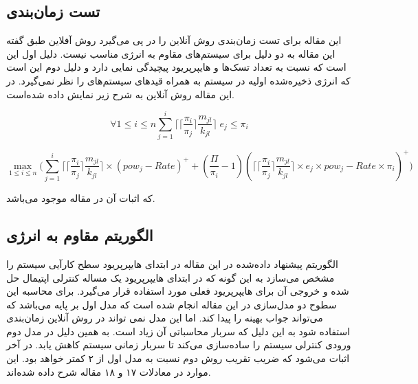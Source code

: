 \documentclass[a4paper, 11pt]{article}
\begin{document}
\subsection{تست زمان‌بندی}
این مقاله برای تست زمان‌بندی روش آنلاین را در پی می‌گیرد
روش آفلاین طبق گفته این مقاله به دو دلیل برای سیستم‌های مقاوم به انرژی مناسب نیست.
دلیل اول این‌ است که نسبت به تعداد تسک‌ها و هایپرپریود پیچیدگی نمایی دارد و دلیل دوم این است
که انرژی ذخیره‌شده اولیه در سیستم به همراه قید‌های سیستم‌های
را نظر نمی‌گیرد.
در این مقاله روش آنلاین به شرح زیر نمایش داده شده‌است.

\begin{equation}
    \forall 1 \le i \le n \sum_{j=1}^{i}\lceil \lceil \frac{\pi_i}{\pi_j} \rceil
\frac{m_{jl}}{k_{jl}} \rceil \; e_j \le \pi_i
\end{equation}

\begin{equation}
    \max\limits_{1 \le i \le n}\Bigg( \sum_{j=1}^{i}\lceil \lceil
\frac{\pi_i}{\pi_j} \rceil \frac{m_{jl}}{k_{jl}} \rceil \times (pow_j - Rate)^+
+  (\frac{\Pi}{\pi_i} - 1)(\lceil \lceil
\frac{\pi_i}{\pi_j} \rceil \frac{m_{jl}}{k_{jl}} \rceil \times e_j \times 
pow_j -Rate \times \pi_i)^+ \Bigg)
\end{equation}

که اثبات آن در مقاله موجود می‌باشد.

\subsection{الگوریتم مقاوم به انرژی}
الگوریتم پیشنهاد داده‌شده در این مقاله در ابتدای هایپرپریود سطح کارآیی سیستم را مشخص می‌سازد
به این گونه که در ابتدای هایپرپریود یک مساله کنترلی اپتیمال حل شده و خروجی آن
برای هایپرپریود فعلی مورد استفاده قرار می‌گیرد.
برای محاسبه این سطوح دو مدل‌سازی در این مقاله انجام شده است که مدل اول بر پایه
می‌باشد که می‌تواند جواب بهینه را پیدا کند. اما این مدل نمی تواند در روش آنلاین زمان‌بندی استفاده
شود به این دلیل که سربار محاسباتی آن زیاد است. به همین دلیل در مدل دوم ورودی کنترلی سیستم
را ساده‌سازی می‌کند تا سربار زمانی سیستم کاهش یابد. در آخر اثبات می‌شود که ضریب تقریب
روش دوم نسبت به مدل اول از ۲ کمتر خواهد بود.
این موارد در معادلات ۱۷ و ۱۸ مقاله شرح داده شده‌اند.
\end{document}

